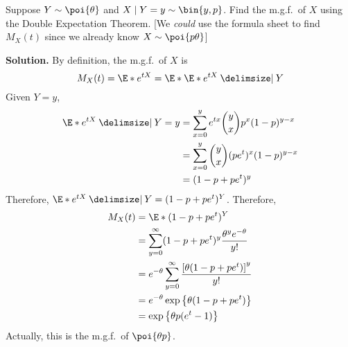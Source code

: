\begin{Example}{}{}
    Suppose $ Y \sim \poi{\theta} $ and $ X\mid Y=y \sim \bin{y,p} $.
    Find the m.g.f.\ of $ X $ using the Double Expectation Theorem.
        [We \emph{could} use the formula sheet to find $ M_X(t) $
            since we already know $ X \sim \poi{p\theta} $]

    \textbf{Solution.} By definition, the m.g.f.\ of $ X $ is
    \[ M_X(t)=\E*{e^{tX}}=\E*{\E*{e^{tX}\given Y}} \]
    Given $ Y=y $,
    \begin{align*}
        \E*{e^{tX}\given Y=y}
         & =\sum_{x=0}^{y} e^{tx}\binom{y}{x}p^x(1-p)^{y-x} \\
         & =\sum_{x=0}^{y}\binom{y}{x}(pe^t)^x(1-p)^{y-x}   \\
         & =(1-p+pe^t)^y
    \end{align*}
    Therefore, $ \E*{e^{tX}\given Y}=(1-p+pe^t)^Y $. Therefore,
    \begin{align*}
        M_X(t)
         & =\E*{(1-p+pe^t)^Y}                                                           \\
         & =\sum_{y=0}^{\infty} (1-p+pe^t)^y \frac{\theta^y e^{-\theta}}{y!}            \\
         & =e^{-\theta}\sum_{y=0}^{\infty} \frac{\left[ \theta(1-p+pe^t) \right]^y}{y!} \\
         & =e^{-\theta}\exp\left\{ \theta(1-p+pe^t)\right\}                             \\
         & =\exp\left\{ \theta p(e^t-1)\right\}
    \end{align*}
    Actually, this is the m.g.f.\ of $ \poi{\theta p} $.
\end{Example}

